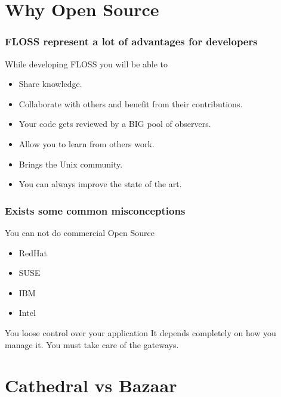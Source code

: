 \documentclass[hyperref={pdfpagelabels=false},xcolor=pst,pdf,fragile]{beamer}
\begin{document}
\section{Why Open Source}

\begin{frame}
  \frametitle{FLOSS represent a lot of advantages for developers}

  While developing FLOSS you will be able to
  \begin{itemize}
	\item Share knowledge.
	\item Collaborate with others and benefit from their contributions.
	\item Your code gets reviewed by a BIG pool of observers.
	\pause
	\item Allow you to learn from others work.
	\item Brings the Unix community.
	\item You can always improve the state of the art.
  \end{itemize}

\end{frame}

\begin{frame}
  \frametitle{Exists some common misconceptions}

  \begin{block}{You can not do commercial Open Source}
	\begin{itemize}
	  \item RedHat
	  \item SUSE
	  \item IBM
	  \item Intel
	\end{itemize}
  \end{block}

  \begin{block}{You loose control over your application}
	It depends completely on how you manage it. You must take care of the
	gateways.
  \end{block}

\end{frame}

\section{Cathedral vs Bazaar}

\end{document}
